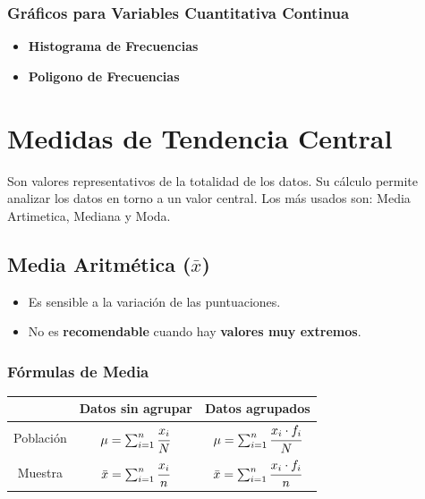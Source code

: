 \documentclass{article}
\begin{document}
            \subsubsection*{Gráficos para Variables Cuantitativa Continua}
                \begin{itemize}
                    \item\textbf{Histograma de Frecuencias} 
                    \item \textbf{Poligono de Frecuencias} 
                \end{itemize}

\section{Medidas de Tendencia Central}    
    Son valores representativos de la totalidad de los datos. Su cálculo permite analizar los datos en torno a un valor central.
    Los más usados son: Media Artimetica, Mediana y Moda.
    \subsection{Media Aritmética (\texorpdfstring{$\bar{x}$}{x-bar})}
        \begin{itemize}
            \item Es sensible a la variación de las puntuaciones.
            \item No es \textbf{recomendable} cuando hay \textbf{valores muy extremos}.
        \end{itemize}
        \subsubsection{Fórmulas de Media}
            \begin{table}[H]
                \centering
                \begin{tabular}{|c|c|c|}
                    \hline
                    &Datos sin agrupar&Datos agrupados \\ \hline
                    Población& $\mu = \sum_{i=1}^{n}\cfrac{x_i}{N}$&$\mu = \sum_{i=1}^{n}\cfrac{x_i\cdot f_i}{N}$ \\ \hline
                    Muestra & $\bar{x} = \sum_{i=1}^{n}\cfrac{x_i}{n}$ & $\bar{x} = \sum_{i=1}^{n}\cfrac{x_i\cdot f_i}{n}$ \\ \hline
                \end{tabular}
            \end{table}
\end{document}
